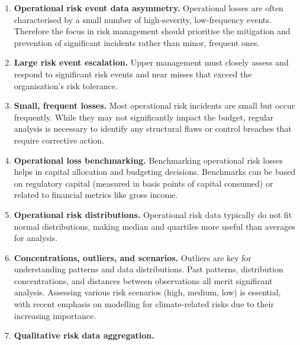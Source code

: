 \begin{enumerate}
\item[\textcolor{rust}{\sffamily\bfseries 1.}] \textbf{Operational risk event data
asymmetry.} Operational losses are often characterised by a small number of
high-severity, low-frequency events. Therefore the focus in risk management should
prioritise the mitigation and prevention of significant incidents rather than
minor, frequent ones.
\item[\textcolor{rust}{\sffamily\bfseries 2.}] \textbf{Large risk event
escalation.} Upper management must closely assess and respond to significant risk
events and near misses that exceed the organisation's risk tolerance.
\item[\textcolor{rust}{\sffamily\bfseries 3.}] \textbf{Small, frequent losses.}
Most operational risk incidents are small but occur frequently. While they may not
significantly impact the budget, regular analysis is necessary to identify any
structural flaws or control breaches that require corrective action.
\item[\textcolor{rust}{\sffamily\bfseries 4.}] \textbf{Operational loss
benchmarking.} Benchmarking operational risk losses helps in capital allocation
and budgeting decisions. Benchmarks can be based on regulatory capital (measured
in basis points of capital consumed) or related to financial metrics like gross
income.
\item[\textcolor{rust}{\sffamily\bfseries 5.}] \textbf{Operational risk
distributions.} Operational risk data typically do not fit normal distributions,
making median and quartiles more useful than averages for analysis.
\item[\textcolor{rust}{\sffamily\bfseries 6.}] \textbf{Concentrations, outliers,
and scenarios.} Outliers are key for understanding patterns and data
distributions. Past patterns, distribution concentrations, and distances between
observations all merit significant analysis. Assessing various risk scenarios
(high, medium, low) is essential, with recent emphasis on modelling for
climate-related risks due to their increasing importance.
\item[\textcolor{rust}{\sffamily\bfseries 7.}] \textbf{Qualitative risk data
aggregation.}
\end{enumerate}
